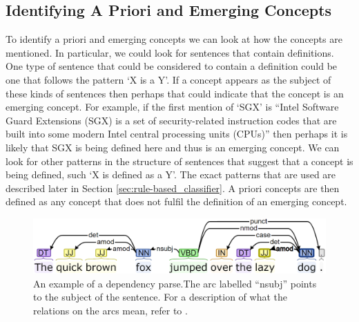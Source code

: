 \documentclass[12pt]{article}
\theoremstyle{grammarstyle}
\begin{document}
\subsection{Identifying A Priori and Emerging Concepts} \label{sec:classifying_concepts}
To identify a priori and emerging concepts we can look at how the concepts are mentioned.
In particular, we could look for sentences that contain definitions.
One type of sentence that could be considered to contain a definition could be one that follows the pattern `X is a Y'.
If a concept appears as the subject of these kinds of sentences then perhaps that could indicate that the concept is an emerging concept.
For example, if the first mention of `SGX' is ``Intel Software Guard Extensions (SGX) is a set of security-related instruction codes that are built into some modern Intel central processing units (CPUs)'' then perhaps it is likely that SGX is being defined here and thus is an emerging concept.
We can look for other patterns in the structure of sentences that suggest that a concept is being defined, such `X is defined as a Y'.
The exact patterns that are used are described later in Section \ref{sec:rule-based_classifier}.
A priori concepts are then defined as any concept that does not fulfil the definition of an emerging concept.


\begin{figure}
    \centering
    \includegraphics[width=\linewidth]{reports/technical_report/latex/figures/dependency_parse.png}
    \caption{An example of a dependency parse.\protect\footnotemark The arc labelled ``nsubj'' points to the subject of the sentence.
    For a description of what the relations on the arcs mean, refer to \citep{martin2018speech}.}
    \label{fig:dependency_parse_example}
\end{figure}

\end{document}
